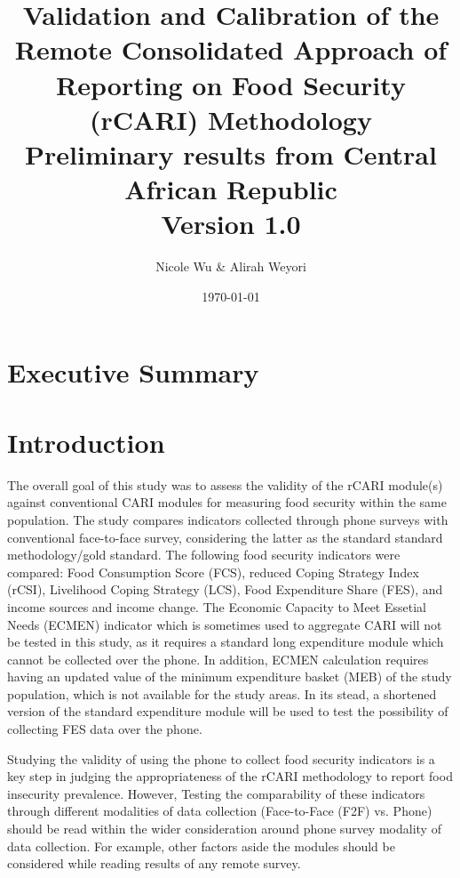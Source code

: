 \documentclass[11pt,harvard]{article}
\author{Nicole Wu \& Alirah Weyori}
\date{\today}
\title{Validation and Calibration of the Remote Consolidated Approach of Reporting on Food Security (rCARI) Methodology 
	\\ {\normalsize Preliminary results from Central African Republic} 
	\\{\normalsize{Version 1.0}} }
\begin{document}
	\maketitle \vspace{-1cm}
	\onehalfspacing
	\pagebreak
	\setlength{\parskip}{6pt} %
	\tableofcontents
	\pagebreak
	
	
\section{Executive Summary}


\pagebreak

\section{Introduction}
	
The overall goal of this study was to assess the validity of the rCARI module(s) against conventional CARI modules for measuring food security within the same population. The study compares indicators collected through phone surveys with conventional face-to-face survey, considering the latter as the standard standard methodology/gold standard. The following food security indicators were compared: Food Consumption Score (FCS), reduced Coping Strategy Index (rCSI), Livelihood Coping Strategy (LCS), Food Expenditure Share (FES), and income sources and income change. The Economic Capacity to Meet Essetial Needs (ECMEN) indicator which is sometimes used to aggregate CARI will not be tested in this study, as it requires a standard long expenditure module which cannot be collected over the phone. In addition, ECMEN calculation requires having an updated value of the minimum expenditure basket (MEB) of the study population, which is not available for the study areas. In its stead, a shortened version of the standard expenditure module will be used to test the possibility of collecting FES data over the phone.
	
Studying the validity of using the phone to collect food security indicators is a key step in judging the appropriateness of the rCARI methodology to report food insecurity prevalence. However, Testing the comparability of these indicators through different modalities of data collection (Face-to-Face (F2F) vs. Phone) should be read within the wider consideration around phone survey modality of data collection. For example, other factors aside the modules should be considered while reading results of any remote survey.
	
\end{document}
